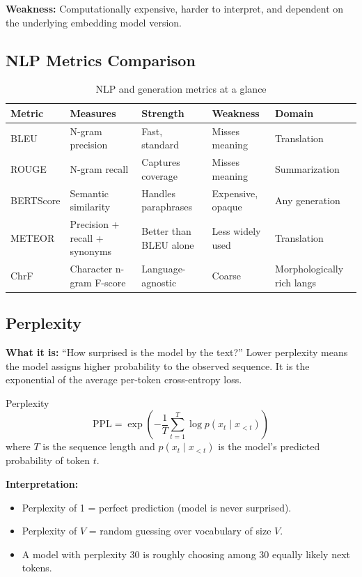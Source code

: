 \textbf{Weakness:} Computationally expensive, harder to interpret, and dependent on the underlying embedding model version.

\subsection{NLP Metrics Comparison}

\begin{table}[H]
\centering
\caption{NLP and generation metrics at a glance}
\begin{tabularx}{\textwidth}{lXXXl}
\toprule
\textbf{Metric} & \textbf{Measures} & \textbf{Strength} & \textbf{Weakness} & \textbf{Domain} \\
\midrule
BLEU & N-gram precision & Fast, standard & Misses meaning & Translation \\
ROUGE & N-gram recall & Captures coverage & Misses meaning & Summarization \\
BERTScore & Semantic similarity & Handles paraphrases & Expensive, opaque & Any generation \\
METEOR & Precision + recall + synonyms & Better than BLEU alone & Less widely used & Translation \\
ChrF & Character n-gram F-score & Language-agnostic & Coarse & Morphologically rich langs \\
\bottomrule
\end{tabularx}
\end{table}

\subsection{Perplexity}

\textbf{What it is:} ``How surprised is the model by the text?'' Lower perplexity means the model assigns higher probability to the observed sequence. It is the exponential of the average per-token cross-entropy loss.

\begin{mathresult}{Perplexity}
\[
\text{PPL} = \exp\left(-\frac{1}{T}\sum_{t=1}^{T}\log p(x_t \mid x_{<t})\right)
\]
where $T$ is the sequence length and $p(x_t \mid x_{<t})$ is the model's predicted probability of token $t$.
\end{mathresult}

\textbf{Interpretation:}
\begin{itemize}
    \item Perplexity of 1 = perfect prediction (model is never surprised).
    \item Perplexity of $V$ = random guessing over vocabulary of size $V$.
    \item A model with perplexity 30 is roughly choosing among 30 equally likely next tokens.
\end{itemize}

